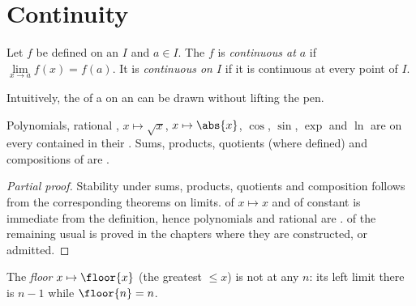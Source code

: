 \section{Continuity}

\begin{definition}[Continuity]\label{def:g12:limcont:continuity}
Let $f$ be defined on an  $I$ and $a \in I$. The  $f$ is
\emph{continuous at $a$} if
$\lim\limits_{x \to a} f(x) = f(a)$. It is \emph{continuous on $I$} if it is
continuous at every point of $I$.
\end{definition}

Intuitively, the  of a   on an  can be drawn
without lifting the pen.

\begin{proposition}\label{prop:g12:limcont:usual}
Polynomials, rational , $x \mapsto \sqrt{x}$, $x \mapsto \abs{x}$,
$\cos$, $\sin$, $\exp$ and $\ln$ are  on every  contained
in their . Sums, products, quotients (where defined) and compositions
of   are .
\end{proposition}

\begin{proof}[Partial proof]
Stability under sums, products, quotients and composition follows from the
corresponding theorems on limits.  of $x \mapsto x$ and of constant
 is immediate from the definition, hence polynomials and rational
 are .  of the remaining usual  is
proved in the chapters where they are constructed, or admitted.
\end{proof}

\begin{example}
The \emph{floor } $x \mapsto \floor{x}$ (the greatest 
$\leq x$) is not  at any  $n$: its left limit there is
$n - 1$ while $\floor{n} = n$.
\end{example}

